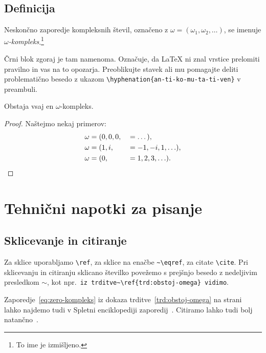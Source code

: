 \documentclass[isrm2, tisk]{fmfdelo}
\begin{document}
    \subsection{Definicija}
    \begin{definicija}
        Neskončno zaporedje kompleksnih števil, označeno z $\omega = (\omega_1, \omega_2, \ldots)$,
        se imenuje \emph{$\omega$-kompleks}.\footnote{To ime je izmišljeno.}

        Črni blok zgoraj je tam namenoma. Označuje, da \LaTeX{} ni znal vrstice prelomiti pravilno
        in vas na to opozarja. Preoblikujte stavek ali mu pomagajte deliti problematično besedo z
        ukazom \verb|\hyphenation{an-ti-ko-mu-ta-ti-ven}| v preambuli.
    \end{definicija}
    \begin{trditev}
        \label{trd:obstoj-omega}
        Obstaja vsaj en $\omega$-kompleks.
    \end{trditev}
    \begin{proof}
        Naštejmo nekaj primerov:
        \begin{align}
            \omega &= (0, 0, 0,& &= \dots), \label{eq:zero-kompleks} \\
            \omega &= (1, i, & &=-1, -i, 1, \ldots), \nonumber \\
            \omega &= (0,& &= 1, 2, 3, \ldots). \nonumber \qedhere  %
        \end{align}
    \end{proof}


    \section{Tehnični napotki za pisanje}

    \subsection{Sklicevanje in citiranje}
    Za sklice uporabljamo \verb|\ref|, za sklice na enačbe \verb|~\eqref|, za citate \verb|\cite|. Pri
    sklicevanju in citiranju sklicano številko povežemo s prejšnjo besedo z nedeljivim presledkom
    $\sim$, kot npr.\ \verb|iz trditve~\ref{trd:obstoj-omega} vidimo|.

    \begin{primer}
        Zaporedje~\eqref{eq:zero-kompleks} iz dokaza trditve~\ref{trd:obstoj-omega} na
        strani~\pageref{trd:obstoj-omega} lahko najdemo tudi v Spletni enciklopediji zaporedij~\cite{oeis}.
        Citiramo lahko tudi bolj natančno~\cite[trditev 2.1, str.\ 23]{lebedev2009introduction}.
    \end{primer}
\end{document}
